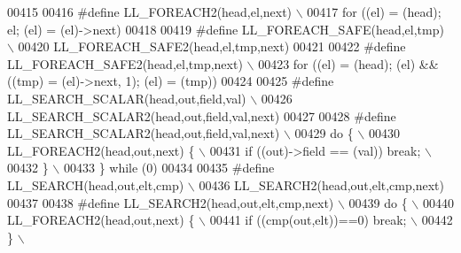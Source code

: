 \begin{DoxyCode}
00415 
00416 \textcolor{preprocessor}{#define LL\_FOREACH2(head,el,next)                                                              \(\backslash\)}
00417 \textcolor{preprocessor}{    for ((el) = (head); el; (el) = (el)->next)}
00418 
00419 \textcolor{preprocessor}{#define LL\_FOREACH\_SAFE(head,el,tmp)                                                           \(\backslash\)}
00420 \textcolor{preprocessor}{    LL\_FOREACH\_SAFE2(head,el,tmp,next)}
00421 
00422 \textcolor{preprocessor}{#define LL\_FOREACH\_SAFE2(head,el,tmp,next)                                                     \(\backslash\)}
00423 \textcolor{preprocessor}{  for ((el) = (head); (el) && ((tmp) = (el)->next, 1); (el) = (tmp))}
00424 
00425 \textcolor{preprocessor}{#define LL\_SEARCH\_SCALAR(head,out,field,val)                                                   \(\backslash\)}
00426 \textcolor{preprocessor}{    LL\_SEARCH\_SCALAR2(head,out,field,val,next)}
00427 
00428 \textcolor{preprocessor}{#define LL\_SEARCH\_SCALAR2(head,out,field,val,next)                                             \(\backslash\)}
00429 \textcolor{preprocessor}{do \{                                                                                           \(\backslash\)}
00430 \textcolor{preprocessor}{    LL\_FOREACH2(head,out,next) \{                                                               \(\backslash\)}
00431 \textcolor{preprocessor}{      if ((out)->field == (val)) break;                                                        \(\backslash\)}
00432 \textcolor{preprocessor}{    \}                                                                                          \(\backslash\)}
00433 \textcolor{preprocessor}{\} while (0)}
00434 
00435 \textcolor{preprocessor}{#define LL\_SEARCH(head,out,elt,cmp)                                                            \(\backslash\)}
00436 \textcolor{preprocessor}{    LL\_SEARCH2(head,out,elt,cmp,next)}
00437 
00438 \textcolor{preprocessor}{#define LL\_SEARCH2(head,out,elt,cmp,next)                                                      \(\backslash\)}
00439 \textcolor{preprocessor}{do \{                                                                                           \(\backslash\)}
00440 \textcolor{preprocessor}{    LL\_FOREACH2(head,out,next) \{                                                               \(\backslash\)}
00441 \textcolor{preprocessor}{      if ((cmp(out,elt))==0) break;                                                            \(\backslash\)}
00442 \textcolor{preprocessor}{    \}                                                                                          \(\backslash\)}

\end{DoxyCode}
